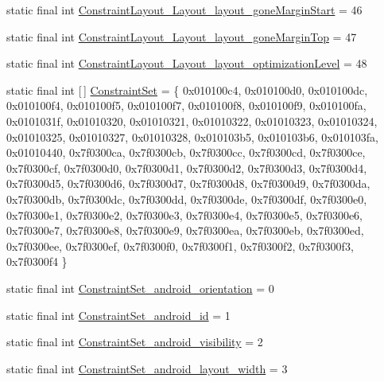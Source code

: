 \begin{DoxyCompactItemize}
\item 
static final int \mbox{\hyperlink{classandroid_1_1support_1_1constraint_1_1R_1_1styleable_a7e3a152bdd30e3f33255d15fd6955754}{Constraint\+Layout\+\_\+\+Layout\+\_\+layout\+\_\+gone\+Margin\+Start}} = 46
\item 
static final int \mbox{\hyperlink{classandroid_1_1support_1_1constraint_1_1R_1_1styleable_ae93fdd158caa003a05fc74549b285e44}{Constraint\+Layout\+\_\+\+Layout\+\_\+layout\+\_\+gone\+Margin\+Top}} = 47
\item 
static final int \mbox{\hyperlink{classandroid_1_1support_1_1constraint_1_1R_1_1styleable_a2f33800d079648c60015daaeca514ce6}{Constraint\+Layout\+\_\+\+Layout\+\_\+layout\+\_\+optimization\+Level}} = 48
\item 
static final int \mbox{[}$\,$\mbox{]} \mbox{\hyperlink{classandroid_1_1support_1_1constraint_1_1R_1_1styleable_aa16c37eee601191a12a97dcf9222a0b9}{Constraint\+Set}} = \{ 0x010100c4, 0x010100d0, 0x010100dc, 0x010100f4, 0x010100f5, 0x010100f7, 0x010100f8, 0x010100f9, 0x010100fa, 0x0101031f, 0x01010320, 0x01010321, 0x01010322, 0x01010323, 0x01010324, 0x01010325, 0x01010327, 0x01010328, 0x010103b5, 0x010103b6, 0x010103fa, 0x01010440, 0x7f0300ca, 0x7f0300cb, 0x7f0300cc, 0x7f0300cd, 0x7f0300ce, 0x7f0300cf, 0x7f0300d0, 0x7f0300d1, 0x7f0300d2, 0x7f0300d3, 0x7f0300d4, 0x7f0300d5, 0x7f0300d6, 0x7f0300d7, 0x7f0300d8, 0x7f0300d9, 0x7f0300da, 0x7f0300db, 0x7f0300dc, 0x7f0300dd, 0x7f0300de, 0x7f0300df, 0x7f0300e0, 0x7f0300e1, 0x7f0300e2, 0x7f0300e3, 0x7f0300e4, 0x7f0300e5, 0x7f0300e6, 0x7f0300e7, 0x7f0300e8, 0x7f0300e9, 0x7f0300ea, 0x7f0300eb, 0x7f0300ed, 0x7f0300ee, 0x7f0300ef, 0x7f0300f0, 0x7f0300f1, 0x7f0300f2, 0x7f0300f3, 0x7f0300f4 \}
\item 
static final int \mbox{\hyperlink{classandroid_1_1support_1_1constraint_1_1R_1_1styleable_a5b993319add79b6a1e4cfe7d0b25d738}{Constraint\+Set\+\_\+android\+\_\+orientation}} = 0
\item 
static final int \mbox{\hyperlink{classandroid_1_1support_1_1constraint_1_1R_1_1styleable_af1e0ad9da8f8e1d727b9a5b443ad31ee}{Constraint\+Set\+\_\+android\+\_\+id}} = 1
\item 
static final int \mbox{\hyperlink{classandroid_1_1support_1_1constraint_1_1R_1_1styleable_a2c33d7ff7fa150efcbfb2e2da30ea366}{Constraint\+Set\+\_\+android\+\_\+visibility}} = 2
\item 
static final int \mbox{\hyperlink{classandroid_1_1support_1_1constraint_1_1R_1_1styleable_ae4bfbc1227ca41b8f4ea92897b5687bf}{Constraint\+Set\+\_\+android\+\_\+layout\+\_\+width}} = 3

\end{DoxyCompactItemize}
